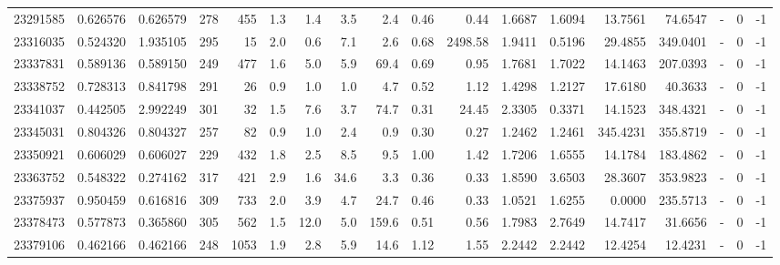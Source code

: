 \begin{tabular}{rrrrrrrrrrrrrrrlrr}
  23291585 & 0.626576 &   0.626579 &  278 &  455 &      1.3 &      1.4 &     3.5 &      2.4 &       0.46 &        0.44 &  1.6687 &  1.6094 &   13.7561 &   74.6547 &             - &        0 &         -1 \\
  23316035 & 0.524320 &   1.935105 &  295 &   15 &      2.0 &      0.6 &     7.1 &      2.6 &       0.68 &     2498.58 &  1.9411 &  0.5196 &   29.4855 &  349.0401 &             - &        0 &         -1 \\
  23337831 & 0.589136 &   0.589150 &  249 &  477 &      1.6 &      5.0 &     5.9 &     69.4 &       0.69 &        0.95 &  1.7681 &  1.7022 &   14.1463 &  207.0393 &             - &        0 &         -1 \\
  23338752 & 0.728313 &   0.841798 &  291 &   26 &      0.9 &      1.0 &     1.0 &      4.7 &       0.52 &        1.12 &  1.4298 &  1.2127 &   17.6180 &   40.3633 &             - &        0 &         -1 \\
  23341037 & 0.442505 &   2.992249 &  301 &   32 &      1.5 &      7.6 &     3.7 &     74.7 &       0.31 &       24.45 &  2.3305 &  0.3371 &   14.1523 &  348.4321 &             - &        0 &         -1 \\
  23345031 & 0.804326 &   0.804327 &  257 &   82 &      0.9 &      1.0 &     2.4 &      0.9 &       0.30 &        0.27 &  1.2462 &  1.2461 &  345.4231 &  355.8719 &             - &        0 &         -1 \\
  23350921 & 0.606029 &   0.606027 &  229 &  432 &      1.8 &      2.5 &     8.5 &      9.5 &       1.00 &        1.42 &  1.7206 &  1.6555 &   14.1784 &  183.4862 &             - &        0 &         -1 \\
  23363752 & 0.548322 &   0.274162 &  317 &  421 &      2.9 &      1.6 &    34.6 &      3.3 &       0.36 &        0.33 &  1.8590 &  3.6503 &   28.3607 &  353.9823 &             - &        0 &         -1 \\
  23375937 & 0.950459 &   0.616816 &  309 &  733 &      2.0 &      3.9 &     4.7 &     24.7 &       0.46 &        0.33 &  1.0521 &  1.6255 &    0.0000 &  235.5713 &             - &        0 &         -1 \\
  23378473 & 0.577873 &   0.365860 &  305 &  562 &      1.5 &     12.0 &     5.0 &    159.6 &       0.51 &        0.56 &  1.7983 &  2.7649 &   14.7417 &   31.6656 &             - &        0 &         -1 \\
  23379106 & 0.462166 &   0.462166 &  248 & 1053 &      1.9 &      2.8 &     5.9 &     14.6 &       1.12 &        1.55 &  2.2442 &  2.2442 &   12.4254 &   12.4231 &             - &        0 &         -1 \\

\end{tabular}
